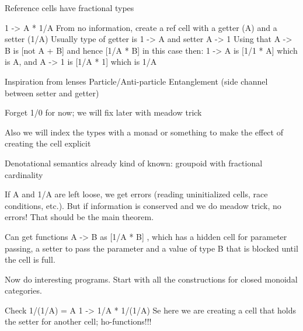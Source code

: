 
Reference cells have fractional types

1 -> A * 1/A
From no information, create a ref cell with a getter (A) and a setter (1/A)
Usually type of getter is 1 -> A and setter A -> 1
Using that A -> B is [not A + B] and hence [1/A * B] in this case then:
1 -> A is [1/1 * A] which is A, and
A -> 1 is [1/A * 1] which is 1/A

Inspiration from lenses
Particle/Anti-particle
Entanglement (side channel between setter and getter)

Forget 1/0 for now; we will fix later with meadow trick

Also we will index the types with a monad or something to make the effect of creating the cell explicit

Denotational semantics already kind of known: groupoid with fractional cardinality

If A and 1/A are left loose, we get errors (reading uninitialized cells, race conditions, etc.). But if information is conserved and we do meadow trick, no errors! That should be the main theorem.

Can get functions A -> B as [1/A * B] , which has a hidden cell for parameter passing, a setter to pass the parameter and a value of type B that is blocked until the cell is full.

Now do interesting programs. Start with all the constructions for closed monoidal categories.

Check 1/(1/A) = A
1 -> 1/A * 1/(1/A)
Se here we are creating a cell that holds the setter for another cell; ho-functions!!!



